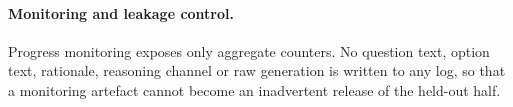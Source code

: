 \paragraph{Monitoring and leakage control.}
Progress monitoring exposes only aggregate counters. No question text, option text, rationale,
reasoning channel or raw generation is written to any log, so that a monitoring artefact cannot
become an inadvertent release of the held-out half.
